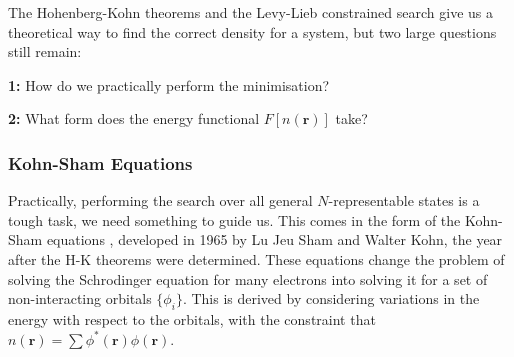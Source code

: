 \documentclass[12pt]{article}
\begin{document}
The Hohenberg-Kohn theorems and the Levy-Lieb constrained search give us a theoretical way to find the correct density for a system, but two large questions still remain: 
\begin{displayquote}
\textbf{1:} How do we practically perform the minimisation?

\textbf{2:} What form does the energy functional $F[n(\mathbf r)]$ take?
\end{displayquote}
\subsubsection{Kohn-Sham Equations}
Practically, performing the search over all general $N$-representable states is a tough task, we need something to guide us. 
This comes in the form of the Kohn-Sham equations \cite{kohn1965self}, developed in 1965 by Lu Jeu Sham and Walter Kohn, the year after the H-K theorems were determined. 
These equations change the problem of solving the Schrodinger equation for many electrons into solving it for a set of non-interacting orbitals $\{\phi_i\}$. This is derived by considering variations in the energy with respect to the orbitals, with the constraint that $n(\mathbf r) = \sum \phi^*(\mathbf r)\phi(\mathbf r)$.
\end{document}
